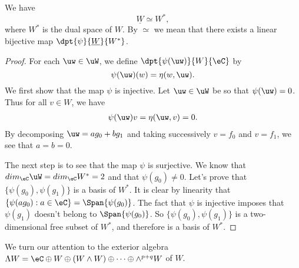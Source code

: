 \begin{proposition}
We have
\begin{equation}
  \underline{W}\simeq W^*,
\end{equation}
where $W^*$ is the dual space of $W$. By $\simeq$ we mean that there exists a linear bijective map $\dpt{\psi}{\underline{W}}{W^*}$.
\end{proposition}
\begin{proof}
For each $\uw\in\uW$, we define $\dpt{\psi(\uw)}{W}{\eC}$ by
\[
   \psi(\uw)(w)=\eta(w,\uw).
\]
We first show that the map $\psi$ is injective. Let $\uw\in\uW$ be so that $\psi(\uw)=0$. Thus for all $v\in W$, we have
\begin{eqnarray}
   \label{3101r1}\psi(\uw)v=\eta(\uw,v)=0.
\end{eqnarray}
By decomposing $\uw=ag_0+bg_1$ and taking successively $v=f_0$ and $v=f_1$, we see that $a=b=0$.

The next step is to see that the map $\psi$ is surjective. We know that $dim_{\eC}\uW=dim_{\eC}W^*=2$ and that $\psi(g_0)\neq 0$. Let's prove that $\{\psi(g_0),\psi(g_1)\}$ is a basis of $W^*$. It is clear by linearity that $\{\psi(ag_0):a\in\eC\}=\Span\{\psi(g_0)\}$. The fact that $\psi$ is injective  imposes that $\psi(g_1)$ doesn't belong to $\Span\{\psi(g_0)\}$. So $\{\psi(g_0),\psi(g_1)\}$ is a two-dimensional free subset of $W^*$, and therefore is a basis of $W^*$.
\end{proof}

We turn our attention to the exterior algebra $\Lambda W=\eC\oplus W\oplus(W\wedge W)\oplus\cdots\oplus\wedge^{p+q}W$ of $W$.

